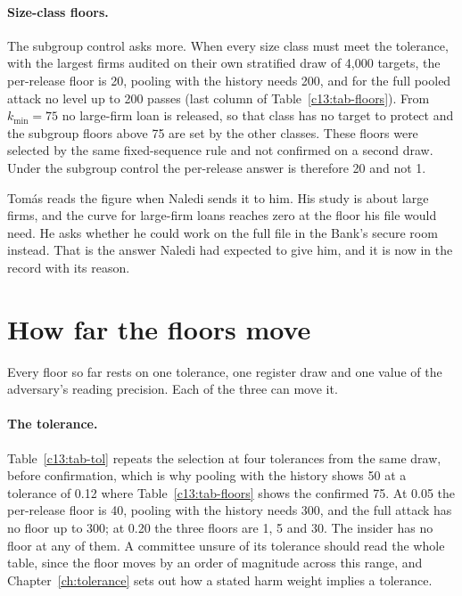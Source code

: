 \paragraph{Size-class floors.} The subgroup control asks more. When every size class
must meet the tolerance, with the largest firms audited on their own stratified draw
of 4{,}000 targets, the per-release floor is 20, pooling with the history needs 200,
and for the full pooled attack no level up to 200 passes (last column of
Table~\ref{c13:tab-floors}). From $k_{\min}=75$ no large-firm loan is released, so
that class has no target to protect and the subgroup floors above 75 are set by the
other classes. These floors were selected by the same fixed-sequence rule and not
confirmed on a second draw. Under the subgroup control the per-release answer is
therefore 20 and not 1.

Tomás reads the figure when Naledi sends it to him. His study is about large firms,
and the curve for large-firm loans reaches zero at the floor his file would need. He
asks whether he could work on the full file in the Bank's secure room instead. That
is the answer Naledi had expected to give him, and it is now in the record with its
reason.

\section{How far the floors move}\label{c13:sec-sensitivity}

Every floor so far rests on one tolerance, one register draw and one value of the
adversary's reading precision. Each of the three can move it.

\paragraph{The tolerance.} Table~\ref{c13:tab-tol} repeats the selection at four
tolerances from the same draw, before confirmation, which is why pooling with the
history shows 50 at a tolerance of 0.12 where Table~\ref{c13:tab-floors} shows the
confirmed 75. At 0.05 the per-release floor is 40, pooling with the history needs 300,
and the full attack has no floor up to 300; at 0.20 the three floors are 1, 5 and 30.
The insider has no floor at any of them. A committee unsure of its tolerance should
read the whole table, since the floor moves by an order of magnitude across this
range, and Chapter~\ref{ch:tolerance} sets out how a stated harm weight implies a
tolerance.


